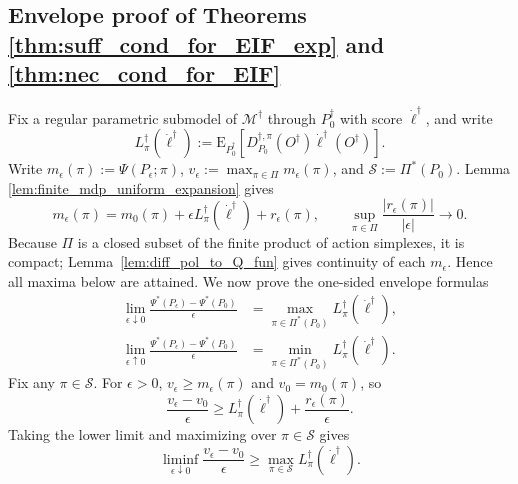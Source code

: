 \documentclass[12pt]{article}
\theoremstyle{remark}\newtheorem{remark}[theorem]{Remark}\theoremstyle{plain}
\newcommand{\E}{\mathrm{E}}
\begin{document}
\subsection{Envelope proof of Theorems
\ref{thm:suff_cond_for_EIF_exp} and \ref{thm:nec_cond_for_EIF}}

Fix a regular parametric submodel of $\mathcal M^\dagger$ through
$P_0^\dagger$ with score $\dot\ell^\dagger$, and write
\[
    L_\pi^\dagger(\dot\ell^\dagger)
    :=\E_{P_0^\dagger}\!\left[
    D_{P_0}^{\dagger,\pi}(O^\dagger)
    \dot\ell^\dagger(O^\dagger)\right].
\]
Write $m_\epsilon(\pi):=\Psi(P_\epsilon;\pi)$,
$v_\epsilon:=\max_{\pi\in\Pi}m_\epsilon(\pi)$, and
$\mathcal S:=\Pi^*(P_0)$.  Lemma
\ref{lem:finite_mdp_uniform_expansion} gives
\begin{equation}\label{eq:uniform_envelope_remainder}
    m_\epsilon(\pi)
    =m_0(\pi)+\epsilon
    L_\pi^\dagger(\dot\ell^\dagger)+r_\epsilon(\pi),
    \qquad
    \sup_{\pi\in\Pi}
    \frac{|r_\epsilon(\pi)|}{|\epsilon|}\longrightarrow0.
\end{equation}
Because $\Pi$ is a closed subset of the finite product of action
simplexes, it is compact; Lemma~\ref{lem:diff_pol_to_Q_fun} gives
continuity of each $m_\epsilon$.  Hence all maxima below are attained.
We now prove the one-sided envelope formulas
\begin{equation}\label{eq:optimal_value_envelope}
    \begin{aligned}
        \lim_{\epsilon\downarrow0}
        \frac{\Psi^*(P_\epsilon)-\Psi^*(P_0)}{\epsilon}
        &=
        \max_{\pi\in\Pi^*(P_0)}
        L_\pi^\dagger(\dot\ell^\dagger),\\
        \lim_{\epsilon\uparrow0}
        \frac{\Psi^*(P_\epsilon)-\Psi^*(P_0)}{\epsilon}
        &=
        \min_{\pi\in\Pi^*(P_0)}
        L_\pi^\dagger(\dot\ell^\dagger).
    \end{aligned}
\end{equation}
Fix any $\pi\in\mathcal S$.  For $\epsilon>0$,
$v_\epsilon\geq m_\epsilon(\pi)$ and $v_0=m_0(\pi)$, so
\[
    \frac{v_\epsilon-v_0}{\epsilon}
    \geq
    L_\pi^\dagger(\dot\ell^\dagger)
    +\frac{r_\epsilon(\pi)}{\epsilon}.
\]
Taking the lower limit and maximizing over $\pi\in\mathcal S$ gives
\begin{equation}\label{eq:envelope_lower}
    \liminf_{\epsilon\downarrow0}
    \frac{v_\epsilon-v_0}{\epsilon}
    \geq
    \max_{\pi\in\mathcal S}
    L_\pi^\dagger(\dot\ell^\dagger).
\end{equation}
\end{document}
